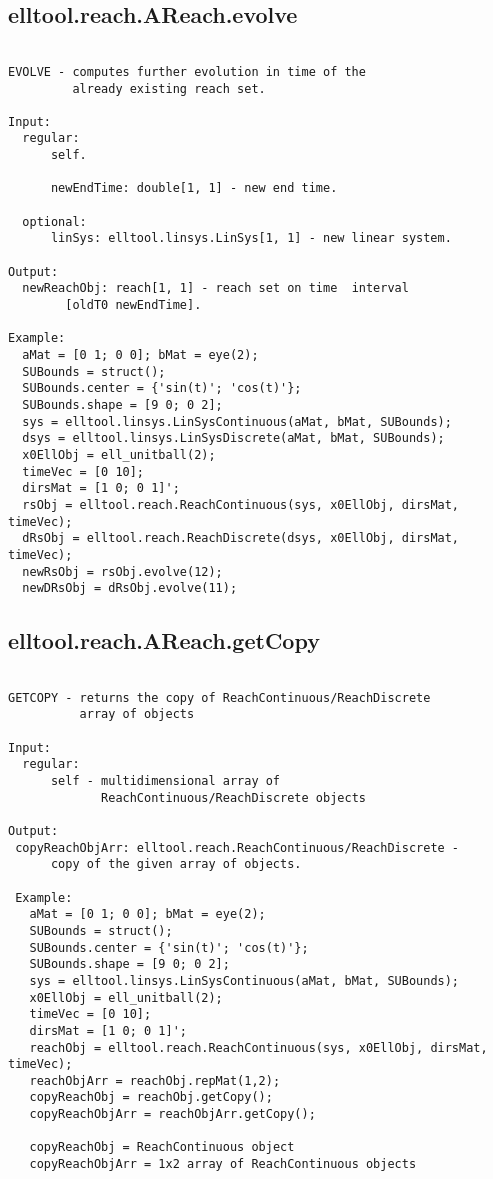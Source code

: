 \subsection{\texorpdfstring{elltool.reach.AReach.evolve}{evolve}}\label{method:elltool.reach.AReach.evolve}
\begin{verbatim}

EVOLVE - computes further evolution in time of the
         already existing reach set.

Input:
  regular:
      self.

      newEndTime: double[1, 1] - new end time.

  optional:
      linSys: elltool.linsys.LinSys[1, 1] - new linear system.

Output:
  newReachObj: reach[1, 1] - reach set on time  interval
        [oldT0 newEndTime].

Example:
  aMat = [0 1; 0 0]; bMat = eye(2);
  SUBounds = struct();
  SUBounds.center = {'sin(t)'; 'cos(t)'};
  SUBounds.shape = [9 0; 0 2];
  sys = elltool.linsys.LinSysContinuous(aMat, bMat, SUBounds);
  dsys = elltool.linsys.LinSysDiscrete(aMat, bMat, SUBounds);
  x0EllObj = ell_unitball(2);
  timeVec = [0 10];
  dirsMat = [1 0; 0 1]';
  rsObj = elltool.reach.ReachContinuous(sys, x0EllObj, dirsMat, timeVec);
  dRsObj = elltool.reach.ReachDiscrete(dsys, x0EllObj, dirsMat, timeVec);
  newRsObj = rsObj.evolve(12);
  newDRsObj = dRsObj.evolve(11);
\end{verbatim}
\subsection{\texorpdfstring{elltool.reach.AReach.getCopy}{getCopy}}\label{method:elltool.reach.AReach.getCopy}
\begin{verbatim}

GETCOPY - returns the copy of ReachContinuous/ReachDiscrete
          array of objects

Input:
  regular:
      self - multidimensional array of
             ReachContinuous/ReachDiscrete objects

Output:
 copyReachObjArr: elltool.reach.ReachContinuous/ReachDiscrete -
      copy of the given array of objects.

 Example:
   aMat = [0 1; 0 0]; bMat = eye(2);
   SUBounds = struct();
   SUBounds.center = {'sin(t)'; 'cos(t)'};
   SUBounds.shape = [9 0; 0 2];
   sys = elltool.linsys.LinSysContinuous(aMat, bMat, SUBounds);
   x0EllObj = ell_unitball(2);
   timeVec = [0 10];
   dirsMat = [1 0; 0 1]';
   reachObj = elltool.reach.ReachContinuous(sys, x0EllObj, dirsMat, timeVec);
   reachObjArr = reachObj.repMat(1,2);
   copyReachObj = reachObj.getCopy();
   copyReachObjArr = reachObjArr.getCopy();

   copyReachObj = ReachContinuous object
   copyReachObjArr = 1x2 array of ReachContinuous objects
\end{verbatim}
